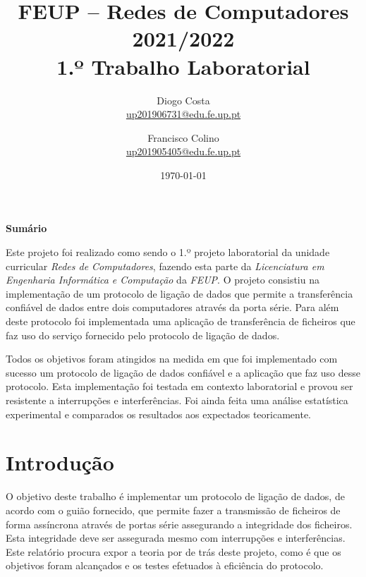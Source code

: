 \documentclass[a4paper,11pt,portuguese]{article}
\begin{document}

\author{
    Diogo Costa\\
    \href{mailto:up201906731@edu.fe.up.pt}{up201906731@edu.fe.up.pt}
    \and
    Francisco Colino\\
    \href{mailto:up201905405@edu.fe.up.pt}{up201905405@edu.fe.up.pt}
}
\title{FEUP -- Redes de Computadores \large 2021/2022 \\ \large 1.º Trabalho Laboratorial}
\date{\today}
\maketitle

\begin{center}
    \textbf{Sumário}
\end{center}

Este projeto foi realizado como sendo o 1.º projeto laboratorial da unidade curricular
\textit{Redes de Computadores}, fazendo esta parte da \textit{Licenciatura em Engenharia
Informática e Computação} da \textit{FEUP}. O projeto consistiu na implementação de um
protocolo de ligação de dados que permite a transferência confiável de dados entre dois
computadores através da porta série. Para além deste protocolo foi implementada uma
aplicação de transferência de ficheiros que faz uso do serviço fornecido pelo protocolo
de ligação de dados. \par

Todos os objetivos foram atingidos na medida em que foi implementado com sucesso um
protocolo de ligação de dados confiável e a aplicação que faz uso desse protocolo. Esta
implementação foi testada em contexto laboratorial e provou ser resistente a interrupções
e interferências. Foi ainda feita uma análise estatística experimental e comparados os
resultados aos expectados teoricamente.


\section{Introdução}

    O objetivo deste trabalho é implementar um protocolo de ligação de dados, 
    de acordo com o guião fornecido, que permite fazer a transmissão de ficheiros 
    de forma assíncrona através de portas série assegurando a integridade dos ficheiros.
    Esta integridade deve ser assegurada mesmo com interrupções e interferências. 
    Este relatório procura expor a teoria por de trás deste projeto, como é que os
    objetivos foram alcançados e os testes efetuados à eficiência do protocolo. \par
\end{document}
